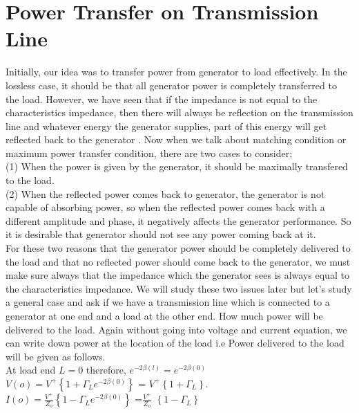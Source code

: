 \section{Power Transfer on Transmission Line}
Initially, our idea was to transfer power from generator to load effectively. In the lossless case, it should be that all generator power is completely transferred to the load. However, we have seen that if the impedance is not equal to the characteristics impedance, then there will always be reflection on the transmission line and whatever energy the generator supplies, part of this energy will get reflected back to the generator . Now when we talk about matching condition or maximum power transfer condition, there are two cases to consider;\\

(1) When the power is given by the generator, it should be maximally transfered to the load.\\
 
(2) When the reflected power comes back to generator, the generator is not capable of absorbing power, so when the reflected power comes back with a different amplitude and phase, it negatively affects the generator performance. So it is desirable that generator should not see any power coming back at it.\\
  
   For these two reasons that the generator power should be completely delivered to the load and that no reflected power should come back to the generator, we must make sure always that the impedance which the generator sees is always equal to the characteristics impedance. We will study these two issues later but let's study a general case and ask if we have a transmission line which is connected to a generator at  one end and a load at the other end. How much power will be delivered to the load. Again without going into voltage and current equation, we can write down power at the location of the load i.e Power delivered to the load will be given as follows.\\

At load end $L=0$ therefore, $e^{-2\beta (l)} = e^{-2\beta (0)}$\\

$V(o)= V^{+} \left\lbrace {1 + \Gamma_L e^{-2\beta(0)}}\right\rbrace $ = $V^{+}\left\lbrace 1 +\Gamma_L \right\rbrace$.
\\

$I(o)= \frac{V^{+}}{Z_o} \left\lbrace {1 - \Gamma_L e^{-2\beta(0)}}\right\rbrace $ =$ \frac{V^{+}}{Z_o}$ $\left\lbrace 1 -\Gamma_L \right\rbrace$ \\

